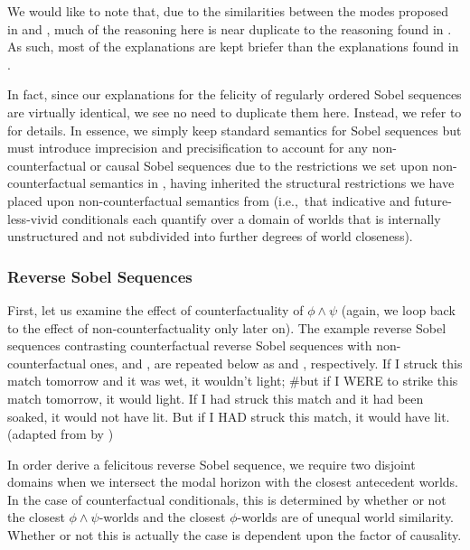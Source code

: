 We would like to note that, due to the similarities between the modes proposed in  and , much of the reasoning here is near duplicate to the reasoning found in . As such, most of the explanations are kept briefer than the explanations found in .

In fact, since our explanations for the felicity of regularly ordered Sobel sequences are virtually identical, we see no need to duplicate them here. Instead, we refer to  for details. In essence, we simply keep  standard semantics for Sobel sequences but must introduce imprecision and precisification to account for any non-counterfactual or causal Sobel sequences due to the restrictions we set upon non-counterfactual semantics in , having inherited the structural restrictions we have placed upon non-counterfactual semantics from  (i.e.,~that indicative and future-less-vivid conditionals each quantify over a domain of worlds that is internally unstructured and not subdivided into further degrees of world closeness).

\subsubsection{Reverse Sobel Sequences}
First, let us examine the effect of counterfactuality of $\phi\land\psi$ (again, we loop back to the effect of non-counterfactuality only later on). The example reverse Sobel sequences contrasting counterfactual reverse Sobel sequences with non-counterfactual ones,  and , are repeated below as  and , respectively.
\ex{}
    If I struck this match tomorrow and it was wet, it wouldn't light; \#but if I \MakeUppercase{were} to strike this match tomorrow, it would light.
\xe
\ex{}If I had struck this match and it had been soaked, it would not have lit. But if I \MakeUppercase{had} struck this match, it would have lit.\\%
\emptyfill(adapted from \textcite[p.~106]{Stalnaker1968} by \textcite[p.~487]{Lewis2018})
\xe

In order derive a felicitous reverse Sobel sequence, we require two disjoint domains when we intersect the modal horizon with the closest antecedent worlds. In the case of counterfactual conditionals, this is determined by whether or not the closest $\phi\land\psi$-worlds and the closest $\phi$-worlds are of unequal world similarity. Whether or not this is actually the case is dependent upon the factor of causality.

